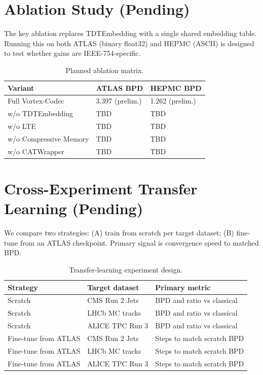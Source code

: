 \documentclass[10pt,twocolumn]{article}
\newcommand{\codec}{Vortex-Codec}
\begin{document}
\section{Ablation Study (Pending)}
The key ablation replaces TDTEmbedding with a single shared embedding table. Running this on both ATLAS (binary float32) and HEPMC (ASCII) is designed to test whether gains are IEEE-754-specific.

\begin{table}[h]
\centering
\small
\caption{Planned ablation matrix.}
\label{tab:ablation}
\begin{tabular}{@{}lll@{}}
\toprule
Variant & ATLAS BPD & HEPMC BPD \\
\midrule
Full \codec & 3.397 (prelim.) & 1.262 (prelim.) \\
w/o TDTEmbedding & TBD & TBD \\
w/o LTE & TBD & TBD \\
w/o Compressive Memory & TBD & TBD \\
w/o CATWrapper & TBD & TBD \\
\bottomrule
\end{tabular}
\end{table}

\section{Cross-Experiment Transfer Learning (Pending)}
We compare two strategies: (A) train from scratch per target dataset; (B) fine-tune from an ATLAS checkpoint. Primary signal is convergence speed to matched BPD.

\begin{table}[h]
\centering
\small
\caption{Transfer-learning experiment design.}
\label{tab:transfer}
\begin{tabular}{@{}lll@{}}
\toprule
Strategy & Target dataset & Primary metric \\
\midrule
Scratch & CMS Run 2 Jets & BPD and ratio vs classical \\
Scratch & LHCb MC tracks & BPD and ratio vs classical \\
Scratch & ALICE TPC Run 3 & BPD and ratio vs classical \\
Fine-tune from ATLAS & CMS Run 2 Jets & Steps to match scratch BPD \\
Fine-tune from ATLAS & LHCb MC tracks & Steps to match scratch BPD \\
Fine-tune from ATLAS & ALICE TPC Run 3 & Steps to match scratch BPD \\
\bottomrule
\end{tabular}
\end{table}
\end{document}
